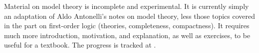 \documentclass[../../include/open-logic-part]{subfiles}
\begin{document}

\begin{editorial}
  Material on model theory is incomplete and experimental.  It is
  currently simply an adaptation of Aldo Antonelli's notes on model
  theory, less those topics covered in the part on first-order logic
  (theories, completeness, compactness).  It requires much more
  introduction, motivation, and explanation, as well as exercises, to
  be useful for a textbook.  The progress is tracked at .
\end{editorial}





\OLEndPartHook
\end{document}
